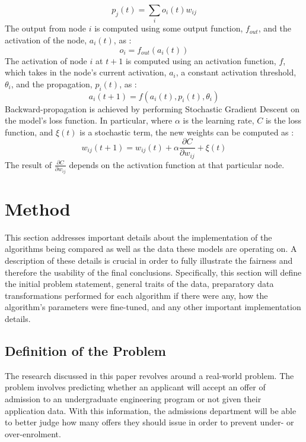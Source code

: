 \documentclass[titlepage]{article}
\begin{document}
$$p_j(t) = \sum\limits_i o_i(t)w_{ij}$$
The output from node $i$ is computed using some output function, $f_{out}$, and the activation of the node, $a_i(t)$, as \cite{AnnMath}:
$$o_i = f_{out}(a_i(t))$$
The activation of node $i$ at $t+1$ is computed using an activation function, $f$, which takes in the node's current activation, $a_i$, a constant activation threshold, $\theta_i$, and the propagation, $p_i(t)$, as \cite{AnnMath}:
$$a_i(t+1) = f(a_i(t), p_i(t), \theta_i)$$
Backward-propagation is achieved by performing Stochastic Gradient Descent on the model's loss function. In particular, where $\alpha$ is the learning rate, $C$ is the loss function, and $\xi(t)$ is a stochastic term, the new weights can be computed as \cite{AnnMath}:
$$w_{ij}(t+1) = w_{ij}(t) + \alpha\frac{\partial C}{\partial w_{ij}} + \xi(t)$$
The result of $\frac{\partial C}{\partial w_{ij}}$ depends on the activation function at that particular node.



\section{Method}
This section addresses important details about the implementation of the algorithms being compared as well as the data these models are operating on. A description of these details is crucial in order to fully illustrate the fairness and therefore the usability of the final conclusions. Specifically, this section will define the initial problem statement, general traits of the data, preparatory data transformations performed for each algorithm if there were any, how the algorithm's parameters were fine-tuned, and any other important implementation details.

\subsection{Definition of the Problem}
The research discussed in this paper revolves around a real-world problem. The problem involves predicting whether an applicant will accept an offer of admission to an undergraduate engineering program or not given their application data. With this information, the admissions department will be able to better judge how many offers they should issue in order to prevent under- or over-enrolment.
\end{document}
